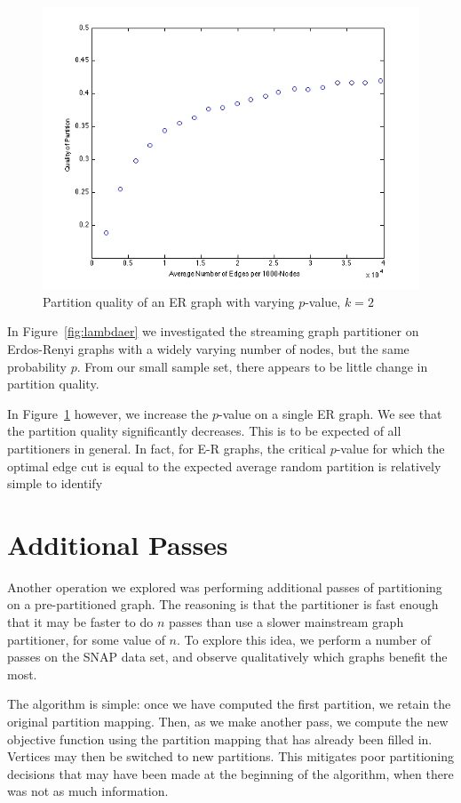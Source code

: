 \documentclass[11pt]{article}
\begin{document}
\begin{figure}[h!]
\centering
  \includegraphics[width=.8\textwidth]{figures/varied_er_p.png}
  \caption{Partition quality of an ER graph with varying $p$-value, $k=2$}
  \label{fig:lambdap}
\end{figure}



In Figure~\ref{fig:lambdaer} we investigated the streaming graph partitioner on Erdos-Renyi graphs with a widely varying number of nodes, but the same probability $p$. From our small sample set, there appears to be little change in partition quality. 

In Figure~\ref{fig:lambdap} however, we increase the $p$-value on a single ER graph. We see that the partition quality significantly decreases. This is to be expected of all partitioners in general. In fact, for E-R graphs, the critical $p$-value for which the optimal edge cut is equal to the expected average random partition is relatively simple to identify~\cite{journals/cj/GanleyH94}

\section{Additional Passes}
Another operation we explored was performing additional passes of partitioning on a pre-partitioned graph. The reasoning is that the partitioner is fast enough that it may be faster to do $n$ passes than use a slower mainstream graph partitioner, for some value of $n$. To explore this idea, we perform a number of passes on the SNAP data set, and observe qualitatively which graphs benefit the most. 

The algorithm is simple: once we have computed the first partition, we retain the original partition mapping. Then, as we make another pass, we compute the new objective function using the partition mapping that has already been filled in. Vertices may then be switched to new partitions. This mitigates poor partitioning decisions that may have been made at the beginning of the algorithm, when there was not as much information. 
\end{document}

